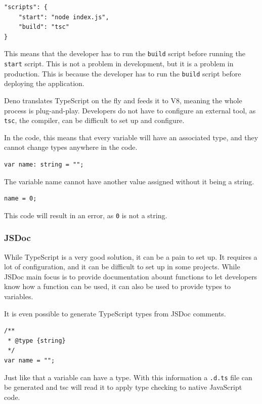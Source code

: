 \documentclass[10pt,journal,compsoc]{IEEEtran}
\begin{document}
\begin{lstlisting}
"scripts": {
    "start": "node index.js",
    "build": "tsc"
}
\end{lstlisting}

This means that the developer has to run the \verb|build| script before running the \verb|start| script. This is not a problem in development, but it is a problem in production. This is because the developer has to run the \verb|build| script before deploying the application.

Deno translates TypeScript on the fly and feeds it to V8, meaning the whole process is plug-and-play. Developers do not have to configure an external tool, as \verb|tsc|, the compiler, can be difficult to set up and configure.

In the code, this means that every variable will have an associated type, and they cannot change types anywhere in the code.

\begin{lstlisting}
var name: string = "";
\end{lstlisting}

The variable name cannot have another value assigned without it being a string.

\begin{lstlisting}
name = 0;
\end{lstlisting}

This code will result in an error, as \verb|0| is not a string.

\subsubsection{JSDoc}

While TypeScript is a very good solution, it can be a pain to set up. It requires a lot of configuration, and it can be difficult to set up in some projects. While JSDoc main focus is to provide documentation abount functions to let developers know how a function can be used, it can also be used to provide types to variables.

It is even possible to generate TypeScript types from JSDoc comments.

\begin{lstlisting}
/**
 * @type {string}
 */
var name = "";
\end{lstlisting}

Just like that a variable can have a type. With this information a \verb|.d.ts| file can be generated and tsc will read it to apply type checking to native JavaScript code.
\end{document}
